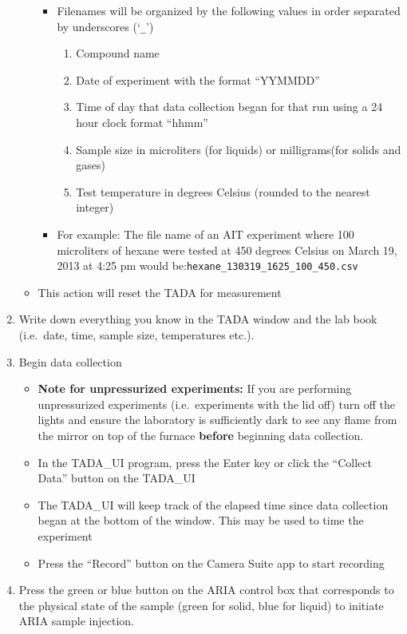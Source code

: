 \begin{enumerate}
\begin{itemize}
    \begin{itemize}
    \tightlist
    \item
      Filenames will be organized by the following values in order
      separated by underscores (`\texttt{\_}')

      \begin{enumerate}
      \def\labelenumii{\arabic{enumii}.}
      \tightlist
      \item
        Compound name
      \item
        Date of experiment with the format ``YYMMDD''
      \item
        Time of day that data collection began for that run using a 24
        hour clock format ``hhmm''
      \item
        Sample size in microliters (for liquids) or milligrams(for
        solids and gases)
      \item
        Test temperature in degrees Celsius (rounded to the nearest
        integer)
      \end{enumerate}
    \item
      For example: The file name of an AIT experiment where 100
      microliters of hexane were tested at 450 degrees Celsius on March
      19, 2013 at 4:25 pm would
      be:\texttt{hexane\_130319\_1625\_100\_450.csv}
    \end{itemize}
  \item
    This action will reset the TADA for measurement
  \end{itemize}
\item
  Write down everything you know in the TADA window and the lab book
  (i.e.~date, time, sample size, temperatures etc.).
\item
  Begin data collection

  \begin{itemize}
  \tightlist
  \item
    \textbf{Note for unpressurized experiments:} If you are performing
    unpressurized experiments (i.e.~experiments with the lid off) turn
    off the lights and ensure the laboratory is sufficiently dark to see
    any flame from the mirror on top of the furnace \textbf{before}
    beginning data collection.
  \item
    In the TADA\_UI program, press the Enter key or click the ``Collect
    Data'' button on the TADA\_UI
  \item
    The TADA\_UI will keep track of the elapsed time since data
    collection began at the bottom of the window. This may be used to
    time the experiment
  \item
    Press the ``Record'' button on the Camera Suite app to start
    recording
  \end{itemize}
\item
  Press the green or blue button on the ARIA control box that
  corresponds to the physical state of the sample (green for solid, blue
  for liquid) to initiate ARIA sample injection.


\end{enumerate}

